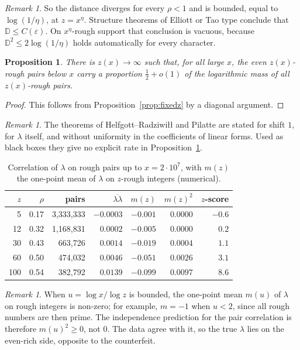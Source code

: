 \documentclass[11pt]{amsart}
\newtheorem{proposition}[theorem]{Proposition}
\theoremstyle{definition}
\theoremstyle{remark}
\newtheorem{remark}[theorem]{Remark}
\newcommand{\D}{\mathbb{D}}
\begin{document}
\begin{remark}
So the distance diverges for every $\rho<1$ and is bounded, equal to $\log(1/\eta)$, at $z=x^\eta$. Structure theorems of Elliott or Tao type conclude that $\D\le C(\varepsilon)$. On $x^\eta$-rough support that conclusion is vacuous, because $\D^2\le2\log(1/\eta)$ holds automatically for every character.
\end{remark}

\begin{proposition}\label{prop:slow}
There is $z(x)\to\infty$ such that, for all large $x$, the even $z(x)$-rough pairs below $x$ carry a proportion $\tfrac12+o(1)$ of the logarithmic mass of all $z(x)$-rough pairs.
\end{proposition}
\begin{proof}
This follows from Proposition~\ref{prop:fixedz} by a diagonal argument.
\end{proof}

\begin{remark}
The theorems of Helfgott--Radziwi\l{}\l{} \cite{HR21} and Pilatte \cite{Pil23} are stated for shift $1$, for $\lambda$ itself, and without uniformity in the coefficients of linear forms. Used as black boxes they give no explicit rate in Proposition~\ref{prop:slow}.
\end{remark}

\begin{table}[h]
\centering\small
\begin{tabular}{rrrrrrr}
\toprule
$z$ & $\rho$ & pairs & $\overline{\lambda\lambda}$ & $m(z)$ & $m(z)^2$ & $z$-score\\
\midrule
5 & 0.17 & 3{,}333{,}333 & $-0.0003$ & $-0.001$ & $0.0000$ & $-0.6$\\
12 & 0.32 & 1{,}168{,}831 & $0.0002$ & $-0.005$ & $0.0000$ & $0.2$\\
30 & 0.43 & 663{,}726 & $0.0014$ & $-0.019$ & $0.0004$ & $1.1$\\
60 & 0.50 & 474{,}032 & $0.0046$ & $-0.051$ & $0.0026$ & $3.1$\\
100 & 0.54 & 382{,}792 & $0.0139$ & $-0.099$ & $0.0097$ & $8.6$\\
\bottomrule
\end{tabular}
\caption{Correlation of $\lambda$ on rough pairs up to $x=2\cdot10^7$, with $m(z)$ the one-point mean of $\lambda$ on $z$-rough integers (numerical).}\label{tab:corr}
\end{table}

\begin{remark}
When $u=\log x/\log z$ is bounded, the one-point mean $m(u)$ of $\lambda$ on rough integers is non-zero; for example, $m=-1$ when $u<2$, since all rough numbers are then prime. The independence prediction for the pair correlation is therefore $m(u)^2\ge0$, not $0$. The data agree with it, so the true $\lambda$ lies on the even-rich side, opposite to the counterfeit.
\end{remark}
\end{document}
